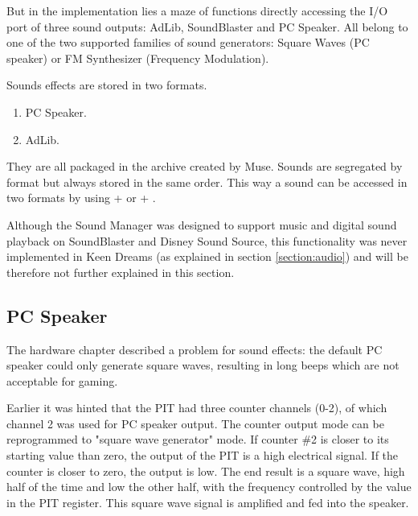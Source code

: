 \documentclass[book.tex]{subfiles}
\begin{document}
But in the implementation lies a maze of functions directly accessing the I/O port of three sound outputs: AdLib, SoundBlaster and PC Speaker. All belong to one of the two supported families of sound generators: Square Waves (PC speaker) or FM Synthesizer (Frequency Modulation). \\

\par
Sounds effects are stored in two formats.
\begin{enumerate}
\item PC Speaker.
\item AdLib.
\end{enumerate}

They are all packaged in the  archive created by Muse. Sounds are segregated by format but always stored in the same order. This way a sound can be accessed in two formats by using  +  or  + .\\

\par
Although the Sound Manager was designed to support music and digital sound playback on SoundBlaster and Disney Sound Source, this functionality was never implemented in Keen Dreams (as explained in section \ref{section:audio}) and will be therefore not further explained in this section.\\

\begin{minipage}{\textwidth}

\end{minipage}



\subsection{PC Speaker}
The hardware chapter described a problem for sound effects: the default PC speaker could only generate square waves, resulting in long beeps which are not acceptable for gaming.\\

\par
Earlier it was hinted that the PIT had three counter channels (0-2), of which channel 2 was used for PC speaker output. The counter output mode can be reprogrammed to "square wave generator" mode. If counter \#2 is closer to its starting value than zero, the output of the PIT is a high electrical signal. If the counter is closer to zero, the output is low. The end result is a square wave, high half of the time and low the other half, with the frequency controlled by the value in the PIT register. This square wave signal is amplified and fed into the speaker. \\
\end{document}

